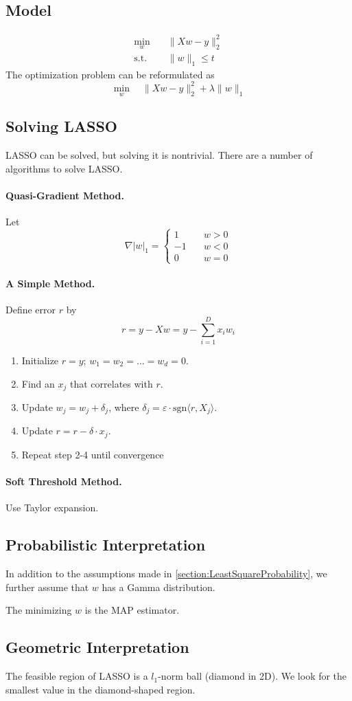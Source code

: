 \subsection{Model}
\begin{align*}
    \min_w \quad &\| Xw - y \|_2^2 \\
    \text{s.t.} \quad &\|w\|_1 \le t
\end{align*}
The optimization problem can be reformulated as
\[ \min_w \quad \| Xw - y \|_2^2 + \lambda \|w\|_1 \]
\subsection{Solving LASSO}
LASSO can be solved, but solving it is nontrivial. There are a number of algorithms to solve LASSO.
\paragraph{Quasi-Gradient Method.}
Let
\[
\nabla |w|_1 =
\begin{cases}
1 \quad &w > 0\\
-1 \quad &w < 0\\
0 \quad &w = 0
\end{cases}
\]
\paragraph{A Simple Method.}
Define error $r$ by
$$ r = y - Xw = y - \sum_{i=1}^D x_iw_i $$
\begin{enumerate}
    \item Initialize $r = y$; $w_1 = w_2 = \dots = w_d = 0$.
    \item Find an $x_j$ that correlates with $r$.
    \item Update $w_j = w_j +\delta_j$, where $\delta_j = \varepsilon\cdot\mathrm{sgn}\langle r, X_j \rangle$.
    \item Update $r = r-\delta\cdot x_j$.
    \item Repeat step 2-4 until convergence
\end{enumerate}
\paragraph{Soft Threshold Method.}
Use Taylor expansion.
\subsection{Probabilistic Interpretation}
In addition to the assumptions made in \ref{section:LeastSquareProbability}, we further assume that $w$ has a Gamma distribution.

The minimizing $w$ is the MAP estimator.
\subsection{Geometric Interpretation}
The feasible region of LASSO is a $l_1$-norm ball (diamond in 2D). We look for the smallest value in the diamond-shaped region.